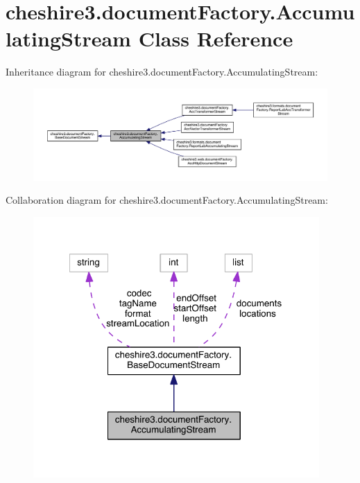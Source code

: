 \hypertarget{classcheshire3_1_1document_factory_1_1_accumulating_stream}{\section{cheshire3.\-document\-Factory.\-Accumulating\-Stream Class Reference}
\label{classcheshire3_1_1document_factory_1_1_accumulating_stream}
}


Inheritance diagram for cheshire3.\-document\-Factory.\-Accumulating\-Stream\-:
\nopagebreak
\begin{figure}[H]
\begin{center}
\leavevmode
\includegraphics[width=350pt]{classcheshire3_1_1document_factory_1_1_accumulating_stream__inherit__graph}
\end{center}
\end{figure}


Collaboration diagram for cheshire3.\-document\-Factory.\-Accumulating\-Stream\-:
\nopagebreak
\begin{figure}[H]
\begin{center}
\leavevmode
\includegraphics[width=309pt]{classcheshire3_1_1document_factory_1_1_accumulating_stream__coll__graph}
\end{center}
\end{figure}
